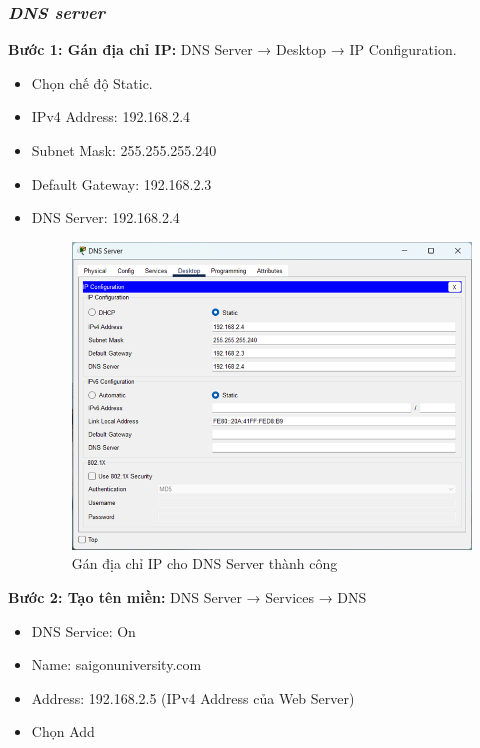 \documentclass[12pt, a4paper]{article}
\begin{document}
	\newpage
	\subsubsection{\textit{DNS server}}
	\begin{flushleft}
		\textbf{Bước 1: Gán địa chỉ IP:}  DNS Server → Desktop → IP Configuration.
		\begin{itemize}[leftmargin=0.75cm]
			\item Chọn chế độ Static.
			\item IPv4 Address: 192.168.2.4
			\item Subnet Mask: 255.255.255.240
			\item Default Gateway: 192.168.2.3
			\item DNS Server: 192.168.2.4
			\begin{figure}[H]
				\centering
				\includegraphics[width=1\textwidth]{dns_ip.png}
				\caption{Gán địa chỉ IP cho DNS Server thành công}
			\end{figure}
		\end{itemize}	
		\newpage
		\textbf{Bước 2: Tạo tên miền:} DNS Server → Services → DNS
		\begin{itemize}[leftmargin=0.75cm]
			\item DNS Service: On
			\item Name: saigonuniversity.com
			\item Address: 192.168.2.5 (IPv4 Address của Web Server)
			\item Chọn Add
			\begin{figure}[H]
				\centering

\end{figure}
\end{itemize}
\end{flushleft}
\end{document}
